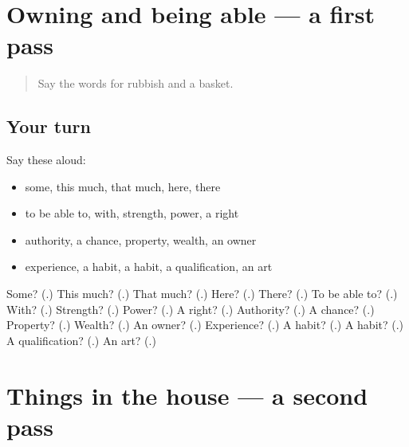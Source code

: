\section[(dialogue)]{Owning and being able — a first pass}

\label{lesson:GU-R109-first-pass-owning-and-being-able}



\begin{quote}
Say the words for rubbish and a basket.
\end{quote}

\subsection*{Your turn}
Say these aloud:

\begin{itemize}
\raggedright
  \item some, this much, that much, here, there
  \item to be able to, with, strength, power, a right
  \item authority, a chance, property, wealth, an owner
  \item experience, a habit, a habit, a qualification, an art
\end{itemize}

\begin{tcolorbox}[breakable,colback=teal!4,colframe=teal!35!black,title={Before you move on}]
Some? (\textbf{}.) This much? (\textbf{}.) That much? (\textbf{}.) Here? (\textbf{}.) There? (\textbf{}.) To be able to? (\textbf{}.) With? (\textbf{}.) Strength? (\textbf{}.) Power? (\textbf{}.) A right? (\textbf{}.) Authority? (\textbf{}.) A chance? (\textbf{}.) Property? (\textbf{}.) Wealth? (\textbf{}.) An owner? (\textbf{}.) Experience? (\textbf{}.) A habit? (\textbf{}.) A habit? (\textbf{}.) A qualification? (\textbf{}.) An art? (\textbf{}.)
\end{tcolorbox}
\section[(dialogue)]{Things in the house — a second pass}

\label{lesson:GU-R109-second-pass-things-in-the-house}



